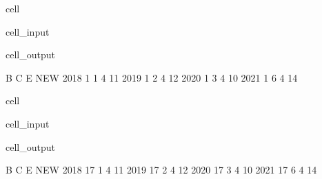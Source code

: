 \documentclass[letterpaper,10pt,english]{jupyterBook}
\begin{document}
\begin{sphinxuseclass}{cell}\begin{sphinxVerbatimInput}

\begin{sphinxuseclass}{cell_input}
\begin{sphinxVerbatim}[commandchars=\\\{\}]
\PYG{p}{[}\PYG{p}{]}\PYG{p}{[}\PYG{p}{]}

\end{sphinxVerbatim}

\end{sphinxuseclass}\end{sphinxVerbatimInput}
\begin{sphinxVerbatimOutput}

\begin{sphinxuseclass}{cell_output}
\begin{sphinxVerbatim}[commandchars=\\\{\}]
      B  C  E  NEW
2018  1  1  4   11
2019  1  2  4   12
2020  1  3  4   10
2021  1  6  4   14
\end{sphinxVerbatim}

\end{sphinxuseclass}\end{sphinxVerbatimOutput}

\end{sphinxuseclass}
\begin{sphinxuseclass}{cell}\begin{sphinxVerbatimInput}

\begin{sphinxuseclass}{cell_input}
\begin{sphinxVerbatim}[commandchars=\\\{\}]
\PYG{p}{[}\PYG{p}{]}
\end{sphinxVerbatim}

\end{sphinxuseclass}\end{sphinxVerbatimInput}
\begin{sphinxVerbatimOutput}

\begin{sphinxuseclass}{cell_output}
\begin{sphinxVerbatim}[commandchars=\\\{\}]
       B  C  E  NEW
2018  17  1  4   11
2019  17  2  4   12
2020  17  3  4   10
2021  17  6  4   14
\end{sphinxVerbatim}

\end{sphinxuseclass}\end{sphinxVerbatimOutput}

\end{sphinxuseclass}
\end{document}
